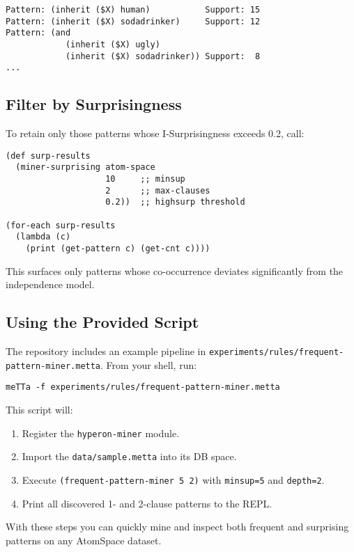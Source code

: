 \begin{verbatim}
Pattern: (inherit ($X) human)           Support: 15
Pattern: (inherit ($X) sodadrinker)     Support: 12
Pattern: (and
            (inherit ($X) ugly)
            (inherit ($X) sodadrinker)) Support:  8
...
\end{verbatim}

\subsection{Filter by Surprisingness}

To retain only those patterns whose I-Surprisingness exceeds 0.2, call:

\begin{verbatim}
(def surp-results
  (miner-surprising atom-space
                    10     ;; minsup
                    2      ;; max-clauses
                    0.2))  ;; highsurp threshold

(for-each surp-results
  (lambda (c)
    (print (get-pattern c) (get-cnt c))))
\end{verbatim}

This surfaces only patterns whose co-occurrence deviates significantly from the independence model.

\subsection{Using the Provided Script}

The repository includes an example pipeline in \texttt{experiments/rules/frequent-pattern-miner.metta}. From your shell, run:

\begin{verbatim}
meTTa -f experiments/rules/frequent-pattern-miner.metta
\end{verbatim}

This script will:
\begin{enumerate}
  \item Register the \texttt{hyperon-miner} module.
  \item Import the \texttt{data/sample.metta} into its DB space.
  \item Execute \texttt{(frequent-pattern-miner 5 2)} with \texttt{minsup=5} and \texttt{depth=2}.
  \item Print all discovered 1- and 2-clause patterns to the REPL.
\end{enumerate}

With these steps you can quickly mine and inspect both frequent and surprising patterns on any AtomSpace dataset.


